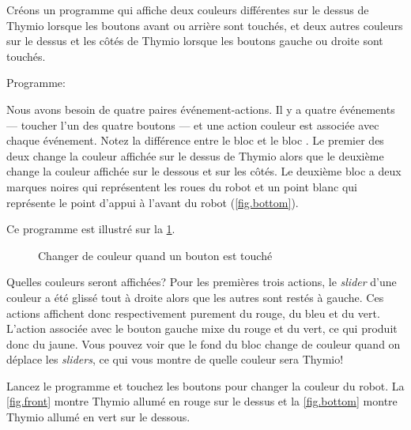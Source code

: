 \label{ch.colors}


Créons un programme qui affiche deux couleurs différentes sur le dessus de Thymio lorsque les boutons avant ou arrière sont touchés, et deux autres couleurs sur le dessus et les côtés de Thymio lorsque les boutons gauche ou droite sont touchés.

{\raggedleft \hfill Programme: }

Nous avons besoin de quatre paires événement-actions.
Il y a quatre événements --- toucher l'un des quatre boutons --- et une action couleur est associée avec chaque événement.
Notez la différence entre le bloc  et le bloc .
Le premier des deux change la couleur affichée sur le dessus de Thymio alors que le deuxième change la couleur affichée sur le dessous et sur les côtés.
Le deuxième bloc a deux marques noires qui représentent les roues du robot et un point blanc qui représente le point d'appui à l'avant du robot (\cref{fig.bottom}).

Ce programme est illustré sur la \cref{fig.colors}.

\begin{figure}
\caption{Changer de couleur quand un bouton est touché}\label{fig.colors}
\end{figure}

Quelles couleurs seront affichées?
Pour les premières trois actions, le \textit{slider} d'une couleur a été glissé tout à droite alors que les autres sont restés à gauche.
Ces actions affichent donc respectivement purement du rouge, du bleu et du vert.
L'action associée avec le bouton gauche mixe du rouge et du vert, ce qui produit donc du jaune.
Vous pouvez voir que le fond du bloc change de couleur quand on déplace les \textit{sliders}, ce qui vous montre de quelle couleur sera Thymio!

Lancez le programme  et touchez les boutons pour changer la couleur du robot.
La \cref{fig.front} montre Thymio allumé en rouge sur le dessus et la \cref{fig.bottom} montre Thymio allumé en vert sur le dessous.



